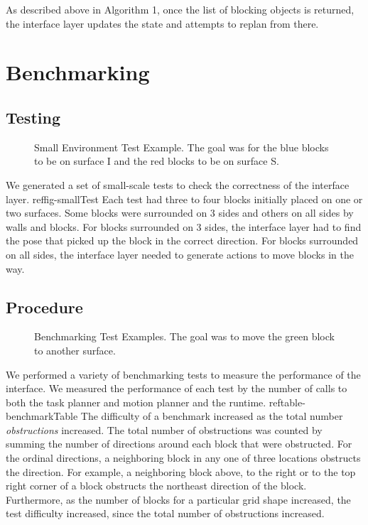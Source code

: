 \documentclass[12pt]{article}
\begin{document}
As described above in Algorithm 1, once the list of blocking objects is returned, the interface layer updates the state and attempts to replan from there.


\section{Benchmarking}
\subsection{Testing}
\begin{figure}[t]
\centering
\def\svgwidth{0.5\textwidth}

\caption{Small Environment Test Example. The goal was for the blue blocks to be on surface I and the red blocks to be on surface S.\label{fig:smallEnv}}
\end{figure}
We generated a set of small-scale tests to check the correctness of the interface layer. ref{fig-smallTest} Each test had three to four blocks initially placed on one or two surfaces. Some blocks were surrounded on 3 sides and others on all sides by walls and blocks. For blocks surrounded on 3 sides, the interface layer had to find the pose that picked up the block in the correct direction. For blocks surrounded on all sides, the interface layer needed to generate actions to move blocks in the way.

\subsection{Procedure}
\begin{figure}[t]
\centering
\def\svgwidth{\textwidth}

\caption{Benchmarking Test Examples. The goal was to move the green block to another surface.\label{fig:benchmark}}

\end{figure}

We performed a variety of benchmarking tests to measure the performance of the interface. We measured the performance of each test by the number of calls to both the task planner and motion planner and the runtime. ref{table-benchmarkTable}
The difficulty of a benchmark increased as the total number \textit{obstructions} increased. The total number of obstructions was counted by summing the number of directions around each block that were obstructed. For the ordinal directions, a neighboring block in any one of three locations obstructs the direction. For example, a neighboring block above, to the right or to the top right corner of a block obstructs the northeast direction of the block. Furthermore, as the number of blocks for a particular grid shape increased, the test difficulty increased, since the total number of obstructions increased.
\end{document}
